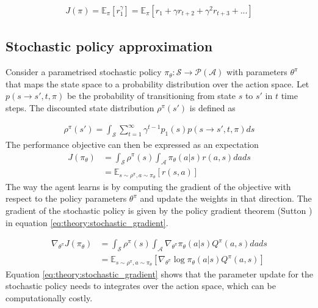 \documentclass[class=book, crop=false]{standalone}
\begin{document}
\begin{equation}
   \begin{aligned}\label{eq:theory:max_discounted_return}
J(\pi)
= \mathbb{E}_{\pi}[r^{\gamma}_{1}]
= \mathbb{E}_{\pi}[ r_{1} + \gamma r_{t+2} + \gamma^{2} r_{t+3} + ...]
\end{aligned} 
\end{equation}

\subsection{Stochastic policy approximation}\label{section:stochastic_policy_approx}
Consider a parametrised stochastic policy $\pi_{\theta}: \mathcal{S}\to \mathcal{P}(\mathcal{A})$ with parameters $\theta^{\pi}$ that maps the state space to a probability distribution over the action space. Let $p(s\to s',t,\pi)$ be the probability of transitioning from state $s$ to $s'$ in $t$ time steps. The discounted state distribution $\rho^{\pi}(s')$ is defined as   

\begin{equation}
   \begin{aligned}\label{eq:theory:discounted_state_distribution}
    \rho^{\pi}(s') = \int_{\mathcal{S}}\sum_{t=1}^{\infty }\gamma^{t-1}p_{1}(s)
    p(s \to s',t,\pi)ds
\end{aligned} 
\end{equation}
The performance objective can then be expressed as an expectation
\begin{equation}
   \begin{aligned}\label{eq:theory:objective_expected_stochastic}
    J(\pi_{\theta}) &= 
    \int_{\mathcal{S}}\rho^{\pi}(s) \int_{\mathcal{A}}\pi_{\theta}(a|s)r(a,s)da ds 
    \\
    &=
    \mathbb{E}_{s\sim \rho^{\pi},a \sim \pi_{\theta}}[r(s,a)]
\end{aligned} 
\end{equation}
 The way the agent learns is by computing the gradient of the objective with respect to the policy parameters $\theta^{\pi}$ and update the weights in that direction. The gradient of the stochastic policy is given by the policy gradient theorem (Sutton \cite{Sutton1998}) in equation \eqref{eq:theory:stochastic_gradient}.

\begin{equation}
   \begin{aligned}\label{eq:theory:stochastic_gradient}
    \nabla_{\theta^{\pi}} J(\pi_{\theta}) &= 
     \int_{\mathcal{S}}\rho^{\pi}(s)
     \int_{\mathcal{A}} \nabla_{\theta^{\pi}} \pi_{\theta}(a|s)Q^{\pi}(a,s)da ds
     \\
     &= \mathbb{E}_{s\sim \rho^{\pi},a \sim \pi_{\theta}}
     [\nabla_{\theta^{\pi}} \log \pi_{\theta}(a|s)Q^{\pi}(a,s) ]
\end{aligned} 
\end{equation}
Equation \eqref{eq:theory:stochastic_gradient} shows that the parameter update for the stochastic policy needs to integrates over the action space, which can be computationally costly.
\end{document}

